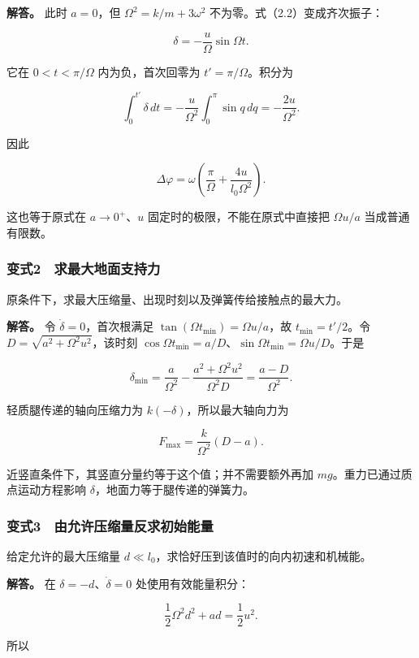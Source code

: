 \documentclass[12pt,a4paper,fontset=fandol]{ctexart}
\begin{document}
\textbf{解答。} 此时 \(a=0\)，但 \(\Omega^2=k/m+3\omega^2\)
不为零。式（2.2）变成齐次振子：

\[
\delta=-\frac{u}{\Omega}\sin\Omega t.
\]

它在 \(0<t<\pi/\Omega\) 内为负，首次回零为 \(t'=\pi/\Omega\)。积分为

\[
\int_0^{t'}\delta\,dt=-\frac{u}{\Omega^2}
\int_0^\pi\sin q\,dq=-\frac{2u}{\Omega^2}.
\]

因此

\[
\Delta\varphi=\omega\left(\frac{\pi}{\Omega}
+\frac{4u}{l_0\Omega^2}\right).
\]

这也等于原式在 \(a\to0^+\)、\(u\) 固定时的极限，不能在原式中直接把
\(\Omega u/a\) 当成普通有限数。

\subsubsection{变式2　求最大地面支持力}\label{ux53d8ux5f0f2-ux6c42ux6700ux5927ux5730ux9762ux652fux6301ux529b}

原条件下，求最大压缩量、出现时刻以及弹簧传给接触点的最大力。

\textbf{解答。} 令 \(\dot\delta=0\)，首次根满足
\(\tan(\Omega t_{\min})=\Omega u/a\)，故 \(t_{\min}=t'/2\)。令
\(D=\sqrt{a^2+\Omega^2u^2}\)，该时刻
\(\cos\Omega t_{\min}=a/D\)、\(\sin\Omega t_{\min}=\Omega u/D\)。于是

\[
\delta_{\min}=\frac a{\Omega^2}
-\frac{a^2+\Omega^2u^2}{\Omega^2D}
=\frac{a-D}{\Omega^2}.
\]

轻质腿传递的轴向压缩力为 \(k(-\delta)\)，所以最大轴向力为

\[
F_{\max}=\frac{k}{\Omega^2}(D-a).
\]

近竖直条件下，其竖直分量约等于这个值；并不需要额外再加
\(mg\)。重力已通过质点运动方程影响
\(\delta\)，地面力等于腿传递的弹簧力。

\subsubsection{变式3　由允许压缩量反求初始能量}\label{ux53d8ux5f0f3-ux7531ux5141ux8bb8ux538bux7f29ux91cfux53cdux6c42ux521dux59cbux80fdux91cf}

给定允许的最大压缩量 \(d\ll l_0\)，求恰好压到该值时的向内初速和机械能。

\textbf{解答。} 在 \(\delta=-d\)、\(\dot\delta=0\) 处使用有效能量积分：

\[
\frac12\Omega^2d^2+ad=\frac12u^2.
\]

所以
\end{document}
